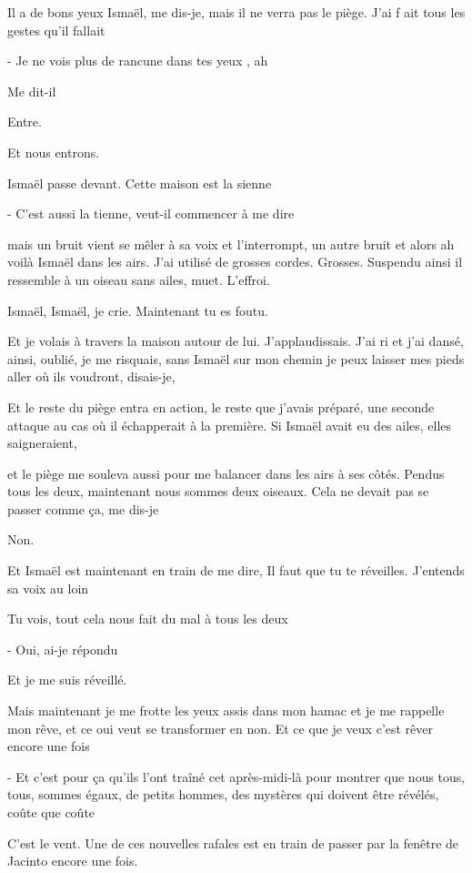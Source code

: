 Il a de bons yeux Ismaël, me dis-je, mais il ne verra pas le piège. J'ai
f ait tous les gestes qu'il fallait

- Je ne vois plus de rancune dans tes yeux , ah

Me dit-il

Entre.

Et nous entrons.

Ismaël passe devant. Cette maison est la sienne

- C'est aussi la tienne, veut-il commencer à me dire

mais un bruit vient se mêler à sa voix et l'interrompt, un autre bruit
et alors ah voilà Ismaël dans les airs. J'ai utilisé de grosses cordes.
Grosses. Suspendu ainsi il ressemble à un oiseau sans ailes, muet.
L'effroi.

Ismaël, Ismaël, je crie. Maintenant tu es foutu.

Et je volais à travers la maison autour de lui. J'applaudissais. J'ai ri
et j'ai dansé, ainsi, oublié, je me risquais, sans Ismaël sur mon chemin
je peux laisser mes pieds aller où ils voudront, disais-je,

Et le reste du piège entra en action, le reste que j'avais préparé, une
seconde attaque au cas où il échapperait à la première. Si Ismaël avait
eu des ailes, elles saigneraient,

et le piège me souleva aussi pour me balancer dans les airs à ses côtés.
Pendus tous les deux, maintenant nous sommes deux oiseaux. Cela ne
devait pas se passer comme ça, me dis-je

Non.

Et Ismaël est maintenant en train de me dire, Il faut que tu te
réveilles. J'entends sa voix au loin

Tu vois, tout cela nous fait du mal à tous les deux

- Oui, ai-je répondu

Et je me suis réveillé.

Mais maintenant je me frotte les yeux assis dans mon hamac et je me
rappelle mon rêve, et ce oui veut se transformer en non. Et ce que je
veux c'est rêver encore une fois

- Et c'est pour ça qu'ils l'ont traîné cet après-midi-là pour montrer
que nous tous, tous, sommes égaux, de petits hommes, des mystères qui
doivent être révélés, coûte que coûte

C'est le vent. Une de ces nouvelles rafales est en train de passer par
la fenêtre de Jacinto encore une fois.

